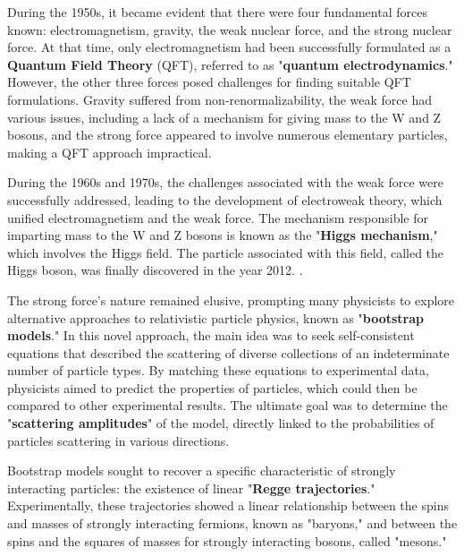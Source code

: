 \documentclass[12pt]{article}
\begin{document}
During the 1950s, it became evident that there were four fundamental forces known: electromagnetism, gravity, the weak nuclear force, and the strong nuclear force. At that time, only electromagnetism had been successfully formulated as a \textbf{Quantum Field Theory} (QFT), referred to as "\textbf{quantum electrodynamics}." However, the other three forces posed challenges for finding suitable QFT formulations. Gravity suffered from non-renormalizability, the weak force had various issues, including a lack of a mechanism for giving mass to the W and Z bosons, and the strong force appeared to involve numerous elementary particles, making a QFT approach impractical.
\newline

During the 1960s and 1970s, the challenges associated with the weak force were successfully addressed, leading to the development of electroweak theory, which unified electromagnetism and the weak force. The mechanism responsible for imparting mass to the W and Z bosons is known as the "\textbf{Higgs mechanism}," which involves the Higgs field. The particle associated with this field, called the Higgs boson, was finally discovered in the year 2012.
.
\newline

The strong force's nature remained elusive, prompting many physicists to explore alternative approaches to relativistic particle physics, known as "\textbf{bootstrap models}." In this novel approach, the main idea was to seek self-consistent equations that described the scattering of diverse collections of an indeterminate number of particle types. By matching these equations to experimental data, physicists aimed to predict the properties of particles, which could then be compared to other experimental results. The ultimate goal was to determine the "\textbf{scattering amplitudes}" of the model, directly linked to the probabilities of particles scattering in various directions.
\newline

Bootstrap models sought to recover a specific characteristic of strongly interacting particles: the existence of linear "\textbf{Regge trajectories}." Experimentally, these trajectories showed a linear relationship between the spins and masses of strongly interacting fermions, known as "baryons," and between the spins and the squares of masses for strongly interacting bosons, called "mesons."
\end{document}
